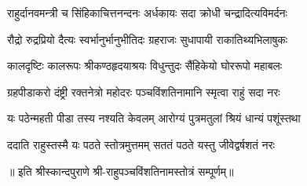 

\twolineshloka
{राहुर्दानवमन्त्री च सिंहिकाचित्तनन्दनः}
{अर्धकायः सदा क्रोधी चन्द्रादित्यविमर्दनः}

\twolineshloka
{रौद्रो रुद्रप्रियो दैत्यः स्वर्भानुर्भानुभीतिदः}
{ग्रहराजः सुधापायी राकातिथ्यभिलाषुकः}

\twolineshloka
{कालदृष्टिः कालरूपः श्रीकण्ठहृदयाश्रयः}
{विधुन्तुदः सैंहिकेयो घोररूपो महाबलः}

\twolineshloka
{ग्रहपीडाकरो दंष्ट्री रक्तनेत्रो महोदरः}
{पञ्चविंशतिनामानि स्मृत्वा राहुं सदा नरः}

\twolineshloka
{यः पठेन्महती पीडा तस्य नश्यति केवलम्}
{आरोग्यं पुत्रमतुलां श्रियं धान्यं पशूंस्तथा}

\twolineshloka
{ददाति राहुस्तस्मै यः पठते स्तोत्रमुत्तमम्}
{सततं पठते यस्तु जीवेद्वर्षशतं नरः}

॥ इति श्रीस्कान्दपुराणे श्री-राहुपञ्चविंशतिनामस्तोत्रं सम्पूर्णम्॥
